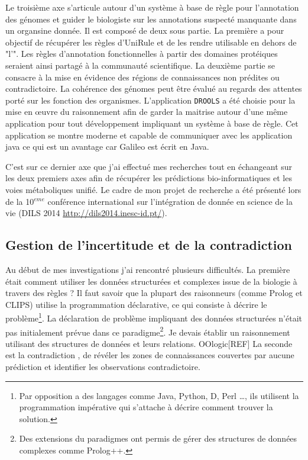 \begin{refsegment}
Le troisième axe s'articule autour d'un système à base de règle pour l'annotation des génomes et guider le biologiste sur les annotations suspecté manquante dans un organsine donnée. Il est composé de deux sous partie. La première a pour objectif de récupérer les règles d'UniRule et de les rendre utilisable en dehors de "l'". Les règles d'annotation fonctionnelles à partir des domaines protéiques seraient ainsi partagé à la communauté scientifique. La deuxième partie se consacre à la mise en évidence des régions de connaissances non prédites ou contradictoire. La cohérence des génomes peut être évalué au regards des attentes porté sur les fonction des organismes. L'application \texttt{DROOLS} a été choisie pour la mise en œuvre du raisonnement afin de garder la maitrise autour d'une même application pour tout développement impliquant un système à base de règle. Cet application se montre moderne et capable de communiquer avec les application java ce  qui est un avantage car Galileo est écrit en Java.

C'est sur ce dernier axe que j'ai effectué mes recherches tout en échangeant sur les deux premiers axes afin de récupérer les prédictions bio-informatiques et les voies métaboliques unifié. Le cadre de mon projet de recherche a été présenté lors de la 10$^{eme}$ conférence international sur l'intégration de donnée en science de la vie (DILS 2014 \url{http://dils2014.inesc-id.pt/}).



\subsection{Gestion de l'incertitude et de la contradiction}

Au début de mes investigations j'ai rencontré plusieurs difficultés. La première était comment utiliser les données structurées et complexes issue de la biologie à travers des règles ? Il faut savoir que la plupart des raisonneurs (comme Prolog et CLIPS) utilise la programmation déclarative, ce qui consiste à décrire le problème\footnote{Par opposition a des langages comme Java, Python, D, Perl \ldots, ils utilisent la programmation impérative qui s'attache à décrire comment trouver la solution.}. La déclaration de problème impliquant  des données structurées n'était pas initialement prévue dans ce paradigme\footnote{Des extensions du paradigmes ont permis de gérer des structures de données complexes comme Prolog++.}. Je devais établir un raisonnement utilisant des structures de données et leurs relations.
OOlogic[REF]
La seconde est la contradiction
, de révéler les zones de connaissances couvertes par aucune prédiction et identifier les observations contradictoire.


\end{refsegment}
